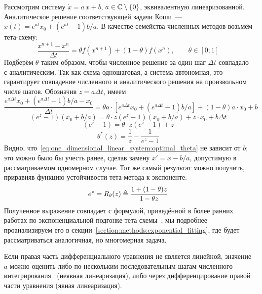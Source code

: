 Рассмотрим систему $ \dot x = a \, x + b $, $ a \in \mathbb{C} \setminus \{ 0 \} $,
эквивалентную линеаризованной.
Аналитическое решение соответствующей задачи Коши~--- $ x(t) = e^{a t} x_0 + (e^{a t} - 1) b / a $.
В качестве семейства численных методов возьмём тета-схему:
%
\begin{equation}
    \label{eq:one_dimensional_linear_system:one_dimensional_theta-method}
    \frac{x^{n+1} - x^n}{\Delta t} = \theta f(x^{n+1}) + (1 - \theta) f(x^n), \qquad \theta \in [0;1]
\end{equation}
%
Подберём $ \theta $ таким образом,
чтобы численное решение за один шаг $ \Delta t $ совпадало с аналитическим.
Так как схема одношаговая, а система автономная,
это гарантирует совпадение численного и аналитического решения на произвольном числе шагов.
Обозначив $ z = a \Delta t $, имеем
\[
    \frac{e^{a \Delta t} x_0 + (e^{a \Delta t} - 1) b / a - x_0}{\Delta t} = \theta a \cdot \left[ e^{a \Delta t} x_0 + (e^{a \Delta t} - 1) b / a \right] + (1 - \theta) a \cdot x_0 + b
\]
\[
    (e^{z} - 1)(x_0 + b / a) = \theta \cdot z (e^{z} - 1)(x_0 + b / a) + z \cdot x_0 + b \Delta t
\]
\[
    (e^{z} - 1) = \theta \cdot z (e^{z} - 1) + z
\]
\begin{equation}
    \label{eq:one_dimensional_linear_system:optimal_theta}
    \theta^*(z) = \frac{1}{z} - \frac{1}{e^{z} - 1}
\end{equation}
%
Видно, что~\eqref{eq:one_dimensional_linear_system:optimal_theta} не зависит от $ b $;
это можно было бы учесть ранее, сделав замену $ x' = x - b/a $,
допустимую в рассматриваемом одномерном случае.
Тот же самый результат можно получить, приравняв функцию устойчивости тета-метода к экспоненте:
\[
    e^z = R_\theta(z) \triangleq \frac{1 + (1 - \theta) z}{1 - \theta z}
\]
Полученное выражение совпадает с формулой, приведённой в более ранних работах по
экспоненциальной подгонке тета-схемы~\cite{liniger1970efficient_integration_methods, lambert1991methods, berzins1992adaptive_theta_method};
мы подробнее проанализируем его в секции~\ref{section:methods:exponential_fitting},
где будет рассматриваться аналогичная,
но многомерная задача.

Если правая часть дифференциального уравнения не является линейной,
значение $ a $ можно оценить либо по нескольким последовательным шагам численного интегрирования~\cite{berzins1992adaptive_theta_method}
(неявная линеаризация),
либо через дифференцирование правой части уравнения (явная линеаризация).


